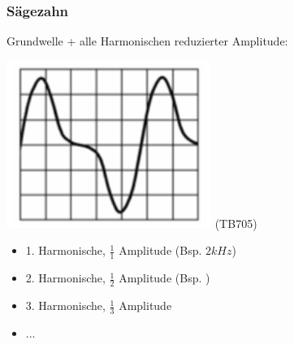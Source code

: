 \begin{frame}
    \frametitle{Sägezahn}

    Grundwelle + alle Harmonischen reduzierter Amplitude:


    \begin{center}
        \includegraphics[width=0.5\textwidth]{a11/TB705.png}
        \tiny (TB705)
    \end{center}

    \begin{itemize}
        \item 1. Harmonische, $\frac{1}{1}$ Amplitude (Bsp. $2kHz$)
        \item 2. Harmonische, $\frac{1}{2}$ Amplitude (Bsp. 
                                                            )
        \item 3. Harmonische, $\frac{1}{3}$ Amplitude
        \item ...
    \end{itemize}

\end{frame}

